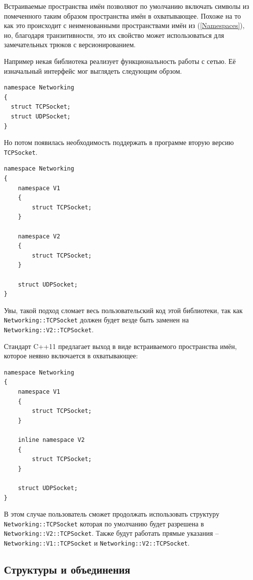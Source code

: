 \documentclass[a4paper,12pt,oneside]{article}
\begin{document}
Встраиваемые пространства имён позволяют по умолчанию включать символы из помеченного таким образом пространства имён в охватывающее. Похоже на то как это происходит с неименованными пространствами имён из (\ref{Namespaces}), но, благодаря транзитивности, это их свойство может использоваться для замечательных трюков с версионированием.

Например некая библиотека реализует функциональность работы с сетью. Её изначальный интерфейс мог выглядеть следующим обрзом.

\begin{lstlisting}
namespace Networking 
{
  struct TCPSocket;
  struct UDPSocket;
}
\end{lstlisting}

Но потом появилась необходимость поддержать в программе вторую версию \lstinline!TCPSocket!.

\begin{lstlisting}
namespace Networking 
{
    namespace V1 
    {
        struct TCPSocket;
    }
     
    namespace V2 
    {
        struct TCPSocket;
    }
 
    struct UDPSocket;
}
\end{lstlisting}

Увы, такой подход сломает весь пользовательский код этой библиотеки, так как \lstinline!Networking::TCPSocket! должен будет везде быть заменен на \lstinline!Networking::V2::TCPSocket!.

Стандарт C++11 предлагает выход в виде встраиваемого пространства имён, которое неявно включается в охватывающее:

\begin{lstlisting}
namespace Networking 
{
    namespace V1 
    {
        struct TCPSocket;
    }
     
    inline namespace V2 
    {
        struct TCPSocket;
    }
 
    struct UDPSocket;
}
\end{lstlisting}

В этом случае пользователь сможет продолжать использовать структуру \lstinline!Networking::TCPSocket! которая по умолчанию будет разрешена в \lstinline!Networking::V2::TCPSocket!. Также будут работать прямые указания -- \lstinline!Networking::V1::TCPSocket! и \lstinline!Networking::V2::TCPSocket!.

\subsection{Структуры и объединения}
\end{document}
